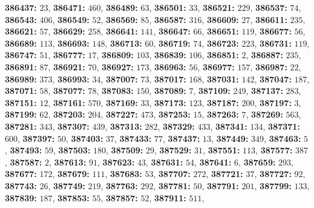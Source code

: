\textsf{\bfseries 386437:} $23$, \textsf{\bfseries 386471:} $460$, \textsf{\bfseries 386489:} $63$, \textsf{\bfseries 386501:} $33$, \textsf{\bfseries 386521:} $229$, \textsf{\bfseries 386537:} $74$, \textsf{\bfseries 386543:} $406$, \textsf{\bfseries 386549:} $52$, \textsf{\bfseries 386569:} $85$, \textsf{\bfseries 386587:} $316$, \textsf{\bfseries 386609:} $27$, \textsf{\bfseries 386611:} $235$, \textsf{\bfseries 386621:} $57$, \textsf{\bfseries 386629:} $258$, \textsf{\bfseries 386641:} $141$, \textsf{\bfseries 386647:} $66$, \textsf{\bfseries 386651:} $119$, \textsf{\bfseries 386677:} $56$, \textsf{\bfseries 386689:} $113$, \textsf{\bfseries 386693:} $148$, \textsf{\bfseries 386713:} $60$, \textsf{\bfseries 386719:} $74$, \textsf{\bfseries 386723:} $223$, \textsf{\bfseries 386731:} $119$, \textsf{\bfseries 386747:} $51$, \textsf{\bfseries 386777:} $17$, \textsf{\bfseries 386809:} $103$, \textsf{\bfseries 386839:} $106$, \textsf{\bfseries 386851:} $2$, \textsf{\bfseries 386887:} $235$, \textsf{\bfseries 386891:} $87$, \textsf{\bfseries 386921:} $70$, \textsf{\bfseries 386927:} $173$, \textsf{\bfseries 386963:} $56$, \textsf{\bfseries 386977:} $157$, \textsf{\bfseries 386987:} $22$, \textsf{\bfseries 386989:} $373$, \textsf{\bfseries 386993:} $34$, \textsf{\bfseries 387007:} $73$, \textsf{\bfseries 387017:} $168$, \textsf{\bfseries 387031:} $142$, \textsf{\bfseries 387047:} $187$, \textsf{\bfseries 387071:} $58$, \textsf{\bfseries 387077:} $78$, \textsf{\bfseries 387083:} $150$, \textsf{\bfseries 387089:} $7$, \textsf{\bfseries 387109:} $249$, \textsf{\bfseries 387137:} $283$, \textsf{\bfseries 387151:} $12$, \textsf{\bfseries 387161:} $570$, \textsf{\bfseries 387169:} $33$, \textsf{\bfseries 387173:} $123$, \textsf{\bfseries 387187:} $200$, \textsf{\bfseries 387197:} $3$, \textsf{\bfseries 387199:} $62$, \textsf{\bfseries 387203:} $204$, \textsf{\bfseries 387227:} $473$, \textsf{\bfseries 387253:} $15$, \textsf{\bfseries 387263:} $7$, \textsf{\bfseries 387269:} $563$, \textsf{\bfseries 387281:} $343$, \textsf{\bfseries 387307:} $439$, \textsf{\bfseries 387313:} $282$, \textsf{\bfseries 387329:} $433$, \textsf{\bfseries 387341:} $134$, \textsf{\bfseries 387371:} $600$, \textsf{\bfseries 387397:} $50$, \textsf{\bfseries 387403:} $37$, \textsf{\bfseries 387433:} $77$, \textsf{\bfseries 387437:} $13$, \textsf{\bfseries 387449:} $349$, \textsf{\bfseries 387463:} $5$, \textsf{\bfseries 387493:} $59$, \textsf{\bfseries 387503:} $180$, \textsf{\bfseries 387509:} $29$, \textsf{\bfseries 387529:} $31$, \textsf{\bfseries 387551:} $113$, \textsf{\bfseries 387577:} $387$, \textsf{\bfseries 387587:} $2$, \textsf{\bfseries 387613:} $91$, \textsf{\bfseries 387623:} $43$, \textsf{\bfseries 387631:} $54$, \textsf{\bfseries 387641:} $6$, \textsf{\bfseries 387659:} $293$, \textsf{\bfseries 387677:} $172$, \textsf{\bfseries 387679:} $111$, \textsf{\bfseries 387683:} $53$, \textsf{\bfseries 387707:} $272$, \textsf{\bfseries 387721:} $37$, \textsf{\bfseries 387727:} $92$, \textsf{\bfseries 387743:} $26$, \textsf{\bfseries 387749:} $219$, \textsf{\bfseries 387763:} $292$, \textsf{\bfseries 387781:} $50$, \textsf{\bfseries 387791:} $201$, \textsf{\bfseries 387799:} $133$, \textsf{\bfseries 387839:} $187$, \textsf{\bfseries 387853:} $55$, \textsf{\bfseries 387857:} $52$, \textsf{\bfseries 387911:} $511$, 
